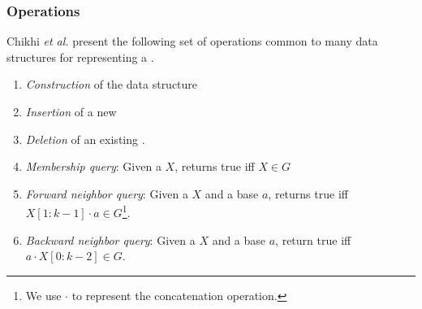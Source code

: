 

\subsubsection{Operations}
\label{subsubsec:dbg-operations}

Chikhi \emph{et al.} \cite{Chikhi2019} present the following set of operations common to many data structures for representing a \dBG {}.

\begin{enumerate}
  \item \emph{Construction} of the data structure
  \item \emph{Insertion} of a new \kmer
  \item \emph{Deletion} of an existing \kmer.
  \item \emph{Membership query}: Given a \kmer $X$, returns true iff $X \in G$
  \item \emph{Forward neighbor query}: Given a \kmer $X$ and a base $a$, returns true iff $X[1:k-1] \cdot a \in G$\footnote{We use $\cdot$ to represent the concatenation operation.}.
  \item \emph{Backward neighbor query}: Given a \kmer $X$ and a base $a$, return true iff $a \cdot X[0:k-2] \in G$.
\end{enumerate}

